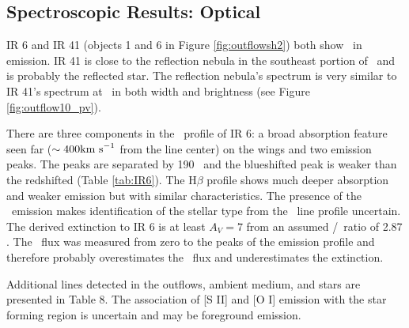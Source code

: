 


\subsection{Spectroscopic Results: Optical}
\label{sec:dis}

IR 6 and IR 41 (objects 1 and 6 in Figure \ref{fig:outflowsh2}) both show
\ha\ in emission.  IR 41 is close to the reflection nebula in the southeast
portion of \region\ and is probably the reflected star.   The reflection
nebula's spectrum is very similar to IR 41's spectrum at \ha\ in both width
and brightness (see Figure \ref{fig:outflow10_pv}).



There are three
components in the \ha\ profile of IR 6: a broad absorption feature seen far
($\sim400\textrm{km~s}^{-1}$ from the line center) on the wings and two emission peaks.  The
peaks are separated by 190 \kms\ and the blueshifted peak is weaker than the
redshifted (Table \ref{tab:IR6}).  The H$\beta$ profile shows much deeper
absorption and weaker emission but with similar characteristics.   The presence of the \ha\ emission
makes identification of the stellar type from the \ha\ line profile uncertain.
The derived extinction to IR 6 is at least $A_V=7$ from an assumed \ha/\hb\
ratio of 2.87 \citep{agnsquared}.  The \hb\ flux was measured from zero to the
peaks of the emission profile and therefore probably overestimates the
\hb\ flux and underestimates the extinction.

Additional lines detected in the outflows, ambient medium, and stars
are presented in Table 8.  The association of [S II] and [O I] emission
with the star forming region is uncertain and may be foreground emission.

